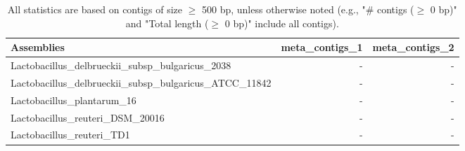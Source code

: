 \documentclass[12pt,a4paper]{article}
\begin{document}
\begin{table}[ht]
\begin{center}
\caption{All statistics are based on contigs of size $\geq$ 500 bp, unless otherwise noted (e.g., "\# contigs ($\geq$ 0 bp)" and "Total length ($\geq$ 0 bp)" include all contigs).}
\begin{tabular}{|l*{2}{|r}|}
\hline
Assemblies & meta\_contigs\_1 & meta\_contigs\_2 \\ \hline
Lactobacillus\_delbrueckii\_subsp\_bulgaricus\_2038 & - & - \\ \hline
Lactobacillus\_delbrueckii\_subsp\_bulgaricus\_ATCC\_11842 & - & - \\ \hline
Lactobacillus\_plantarum\_16 & - & - \\ \hline
Lactobacillus\_reuteri\_DSM\_20016 & - & - \\ \hline
Lactobacillus\_reuteri\_TD1 & - & - \\ \hline
\end{tabular}
\end{center}
\end{table}
\end{document}
